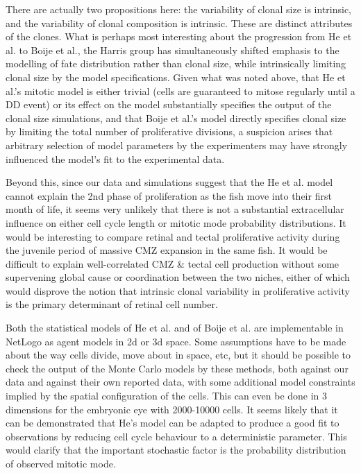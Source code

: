 \documentclass{ut-thesis}
\begin{document}
\bigskip

There are actually two propositions here: the variability of clonal size is intrinsic, and the variability of clonal composition is intrinsic. These are distinct attributes of the clones. What is perhaps most interesting about the progression from He et al. to Boije et al., the Harris group has simultaneously shifted emphasis to the modelling of fate distribution rather than clonal size, while intrinsically limiting clonal size by the model specifications. Given what was noted above, that He et al.'s mitotic model is either trivial (cells are guaranteed to mitose regularly until a DD event) or its effect on the model substantially specifies the output of the clonal size simulations, and that Boije et al.'s model directly specifies clonal size by limiting the total number of proliferative divisions, a suspicion arises that arbitrary selection of model parameters by the experimenters may have strongly influenced the model's fit to the experimental data. 

Beyond this, since our data and simulations suggest that the He et al. model cannot explain the 2nd phase of proliferation as the fish move into their first month of life, it seems very unlikely that there is not a substantial extracellular influence on either cell cycle length or mitotic mode probability distributions. It would be interesting to compare retinal and tectal proliferative activity during the juvenile period of massive CMZ expansion in the same fish. It would be difficult to explain well-correlated CMZ & tectal cell production without some supervening global cause or coordination between the two niches, either of which would disprove the notion that intrinsic clonal variability in proliferative activity is the primary determinant of retinal cell number.

Both the statistical models of He et al. and of Boije et al. are implementable in NetLogo as agent models in 2d or 3d space. Some assumptions have to be made about the way cells divide, move about in space, etc, but it should be possible to check the output of the Monte Carlo models by these methods, both against our data and against their own reported data, with some additional model constraints implied by the spatial configuration of the cells. This can even be done in 3 dimensions for the embryonic eye with 2000-10000 cells. It seems likely that it can be demonstrated that He's model can be adapted to produce a good fit to observations by reducing cell cycle behaviour to a deterministic parameter. This would clarify that the important stochastic factor is the probability distribution of observed mitotic mode. 
\end{document}
